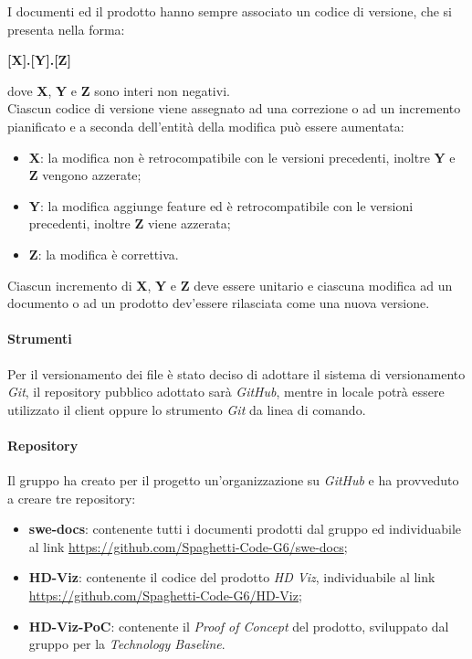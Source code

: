 I documenti ed il prodotto hanno sempre associato un codice di versione, che si presenta nella forma:
\begin{center}
    \textbf{[X].[Y].[Z]}
\end{center}
dove \textbf{X}, \textbf{Y} e \textbf{Z} sono interi non negativi.\\
Ciascun codice di versione viene assegnato ad una correzione o ad un incremento pianificato e a seconda dell'entit\`{a} della modifica 
pu\`{o} essere aumentata: 
\begin{itemize}
	\item \textbf{X}: la modifica non è retrocompatibile con le versioni precedenti, inoltre \textbf{Y} e \textbf{Z} vengono azzerate;
	\item \textbf{Y}: la modifica aggiunge feature ed è retrocompatibile con le versioni precedenti, inoltre \textbf{Z} viene azzerata;
	\item \textbf{Z}: la modifica è correttiva.
\end{itemize}
Ciascun incremento di \textbf{X}, \textbf{Y} e \textbf{Z} deve essere unitario e ciascuna modifica ad un documento o ad un prodotto 
dev'essere rilasciata come una nuova versione.

\paragraph{Strumenti}
\label{par:gestione_configurazione:strumenti}

Per il versionamento dei file è stato deciso di adottare il sistema di versionamento \emph{Git}, il repository pubblico adottato sarà 
\emph{GitHub}, mentre in locale potrà essere utilizzato il client  oppure lo strumento \emph{Git} da linea di 
comando.

\paragraph{Repository}
\label{par:repo}

Il gruppo ha creato per il progetto un'organizzazione su \emph{GitHub} e ha provveduto a creare tre repository:
\begin{itemize}
    \item \textbf{swe-docs}: contenente tutti i documenti prodotti dal gruppo ed individuabile al link 
    	\url{https://github.com/Spaghetti-Code-G6/swe-docs};
    \item \textbf{HD-Viz}: contenente il codice del prodotto \emph{HD Viz}, individuabile al link \url{https://github.com/Spaghetti-Code-G6/HD-Viz};
    \item \textbf{HD-Viz-PoC}: contenente il \emph{Proof of Concept} del prodotto, sviluppato dal gruppo per la \emph{Technology Baseline}.
\end{itemize}

